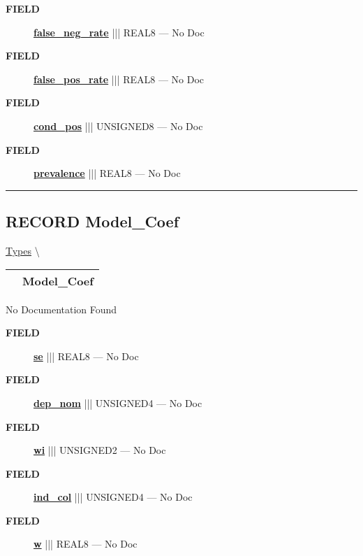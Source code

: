 \begin{description}
\item [\colorbox{tagtype}{\color{white} \textbf{\textsf{FIELD}}}] \textbf{\underline{false\_neg\_rate}} ||| REAL8 --- No Doc
\item [\colorbox{tagtype}{\color{white} \textbf{\textsf{FIELD}}}] \textbf{\underline{false\_pos\_rate}} ||| REAL8 --- No Doc
\item [\colorbox{tagtype}{\color{white} \textbf{\textsf{FIELD}}}] \textbf{\underline{cond\_pos}} ||| UNSIGNED8 --- No Doc
\item [\colorbox{tagtype}{\color{white} \textbf{\textsf{FIELD}}}] \textbf{\underline{prevalence}} ||| REAL8 --- No Doc
\end{description}





\rule{\linewidth}{0.5pt}
\subsection*{\textsf{\colorbox{headtoc}{\color{white} RECORD}
Model\_Coef}}

\hypertarget{ecldoc:logisticregression.types.model_coef}{}
\hspace{0pt} \hyperlink{ecldoc:LogisticRegression.Types}{Types} \textbackslash 

{\renewcommand{\arraystretch}{1.5}
\begin{tabularx}{\textwidth}{|>{\raggedright\arraybackslash}l|X|}
\hline
\hspace{0pt}\mytexttt{\color{red} } & \textbf{Model\_Coef} \\
\hline
\end{tabularx}
}

\par





No Documentation Found







\par
\begin{description}
\item [\colorbox{tagtype}{\color{white} \textbf{\textsf{FIELD}}}] \textbf{\underline{se}} ||| REAL8 --- No Doc
\item [\colorbox{tagtype}{\color{white} \textbf{\textsf{FIELD}}}] \textbf{\underline{dep\_nom}} ||| UNSIGNED4 --- No Doc
\item [\colorbox{tagtype}{\color{white} \textbf{\textsf{FIELD}}}] \textbf{\underline{wi}} ||| UNSIGNED2 --- No Doc
\item [\colorbox{tagtype}{\color{white} \textbf{\textsf{FIELD}}}] \textbf{\underline{ind\_col}} ||| UNSIGNED4 --- No Doc
\item [\colorbox{tagtype}{\color{white} \textbf{\textsf{FIELD}}}] \textbf{\underline{w}} ||| REAL8 --- No Doc
\end{description}





